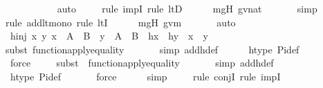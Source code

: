 \begin{isabellebody}
\ \ \ \ \ \ \ \ \ \isamarkupfalse%
\ auto{\isacharbrackleft}{\kern0pt}{}{\isacharbrackright}{\kern0pt}\isanewline
\ \ \ \ \isamarkupfalse%
{\isacharparenleft}{\kern0pt}rule\ impI{\isacharcomma}{\kern0pt}\ rule\ ltD{\isacharparenright}{\kern0pt}\isanewline
\ \ \ \ \isamarkupfalse%
\ mgH\ gvnat\ \isanewline
\ \ \ \ \isamarkupfalse%
\ simp\isanewline
\ \ \ \ \isamarkupfalse%
{\isacharparenleft}{\kern0pt}rule\ add{\isacharunderscore}{\kern0pt}lt{\isacharunderscore}{\kern0pt}mono{}{\isacharcomma}{\kern0pt}\ rule\ ltI{\isacharparenright}{\kern0pt}\isanewline
\ \ \ \ \isamarkupfalse%
\ mgH\ gvm\ \isanewline
\ \ \ \ \isamarkupfalse%
\ auto\isanewline
\ \ \isamarkupfalse%
\ hinj{\isacharcolon}{\kern0pt}\ {\isachardoublequoteopen}{\isasymAnd}x\ y{\isachardot}{\kern0pt}\ x\ {\isasymin}\ A\ {\isasymunion}\ B\ {\isasymLongrightarrow}\ y\ {\isasymin}\ A\ {\isasymunion}\ B\ {\isasymLongrightarrow}\ h{\isacharbackquote}{\kern0pt}x\ {\isacharequal}{\kern0pt}\ h{\isacharbackquote}{\kern0pt}y\ {\isasymlongrightarrow}\ x\ {\isacharequal}{\kern0pt}\ y{\isachardoublequoteclose}\ \isanewline
\ \ \ \ \isamarkupfalse%
{\isacharparenleft}{\kern0pt}subst\ function{\isacharunderscore}{\kern0pt}apply{\isacharunderscore}{\kern0pt}equality{\isacharparenright}{\kern0pt}\isanewline
\ \ \ \ \ \ \isamarkupfalse%
{\isacharparenleft}{\kern0pt}simp\ add{\isacharcolon}{\kern0pt}h{\isacharunderscore}{\kern0pt}def{\isacharparenright}{\kern0pt}\isanewline
\ \ \ \ \isamarkupfalse%
\ htype\ Pi{\isacharunderscore}{\kern0pt}def\isanewline
\ \ \ \ \ \isamarkupfalse%
\ force\isanewline
\ \ \ \ \isamarkupfalse%
{\isacharparenleft}{\kern0pt}subst\ {\isacharparenleft}{\kern0pt}{}{\isacharparenright}{\kern0pt}\ function{\isacharunderscore}{\kern0pt}apply{\isacharunderscore}{\kern0pt}equality{\isacharparenright}{\kern0pt}\isanewline
\ \ \ \ \ \ \isamarkupfalse%
{\isacharparenleft}{\kern0pt}simp\ add{\isacharcolon}{\kern0pt}h{\isacharunderscore}{\kern0pt}def{\isacharparenright}{\kern0pt}\isanewline
\ \ \ \ \isamarkupfalse%
\ htype\ Pi{\isacharunderscore}{\kern0pt}def\isanewline
\ \ \ \ \ \isamarkupfalse%
\ force\isanewline
\ \ \ \ \isamarkupfalse%
\ simp\isanewline
\ \ \ \ \isamarkupfalse%
{\isacharparenleft}{\kern0pt}rule\ conjI{\isacharcomma}{\kern0pt}\ rule\ impI{\isacharparenright}{\kern0pt}{\isacharplus}{\kern0pt}\isanewline

\end{isabellebody}
